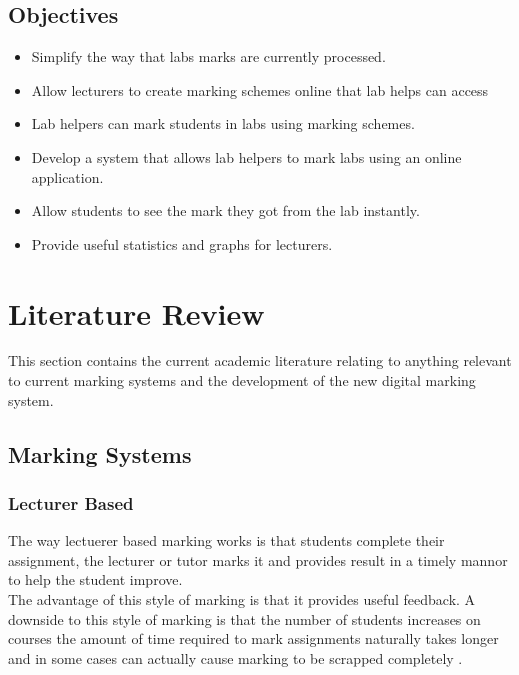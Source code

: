 \documentclass[12pt]{article}  %
\begin{document}
\subsection{Objectives}
\begin{itemize}
\item Simplify the way that labs marks are currently processed.
\item Allow lecturers to create marking schemes online that lab helps can access
\item Lab helpers can mark students in labs using marking schemes.
\item Develop a system that allows lab helpers to mark labs using an online application.
\item Allow students to see the mark they got from the lab instantly.
\item Provide useful statistics and graphs for lecturers.
\end{itemize}




\newpage
\section{Literature Review}
This section contains the current academic literature relating to anything relevant to current marking systems and the development of the new digital marking system.


\subsection {Marking Systems}

\subsubsection{Lecturer Based}
The way lectuerer based marking works is that students complete their assignment, the lecturer or tutor marks it and provides result in a timely mannor to help the student improve.\\
The advantage of this style of marking is that it provides useful feedback.
A downside to this style of marking is that the number of students increases on courses the amount of time required to mark assignments naturally takes longer and in some cases can actually cause marking to be scrapped completely \cite{brown_assessment_1999}.  
\end{document}
